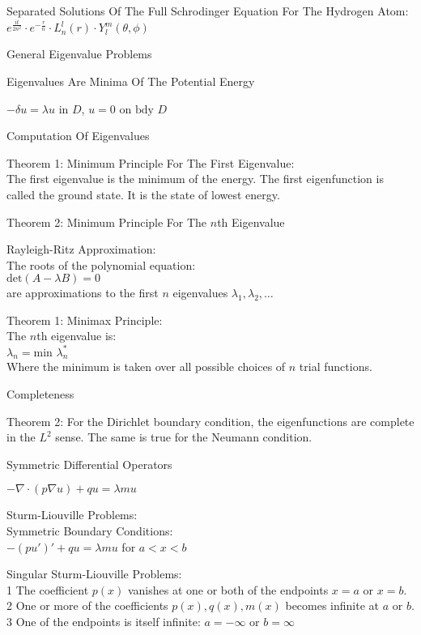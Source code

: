 Separated Solutions Of The Full Schrodinger Equation For The Hydrogen Atom: \\
$e^{\frac{it}{2n^2}} \cdot e^{-\frac{r}{n}} \cdot L_n^l (r) \cdot Y_l^m (\theta,\phi)$

General Eigenvalue Problems

Eigenvalues Are Minima Of The Potential Energy

$- \delta u = \lambda u$ in $D$, $u=0$ on $\text{bdy }D$

Computation Of Eigenvalues

Theorem 1: Minimum Principle For The First Eigenvalue: \\
The first eigenvalue is the minimum of the energy. The first eigenfunction is called the ground state. It is the state of lowest energy.

Theorem 2: Minimum Principle For The $n$th Eigenvalue

Rayleigh-Ritz Approximation: \\
The roots of the polynomial equation: \\
$\text{det}(A-\lambda B)=0$ \\
are approximations to the first $n$ eigenvalues $\lambda_1, \lambda_2, \dots$

Theorem 1: Minimax Principle: \\
The $n$th eigenvalue is: \\
$\lambda_n = \text{min }\lambda_n^*$ \\
Where the minimum is taken over all possible choices of $n$ trial functions.

Completeness

Theorem 2: For the Dirichlet boundary condition, the eigenfunctions are complete in the $L^2$ sense. The same is true for the Neumann condition.

Symmetric Differential Operators

$- \nabla \cdot (p \nabla u) + qu = \lambda mu$

Sturm-Liouville Problems: \\
Symmetric Boundary Conditions: \\
$-(pu')'+qu=\lambda mu$ for $a<x<b$

Singular Sturm-Liouville Problems: \\
1 The coefficient $p(x)$ vanishes at one or both of the endpoints $x=a$ or $x=b$. \\
2 One or more of the coefficients $p(x),q(x),m(x)$ becomes infinite at $a$ or $b$. \\
3 One of the endpoints is itself infinite: $a = -\infty$ or $b = \infty$

